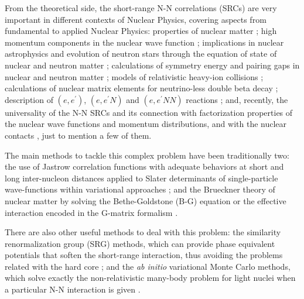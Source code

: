 \documentclass[aps,twocolumn,showpacs,preprintnumbers,amsmath,amssymb,nofootinbib,superscriptaddress,showkeys,noeprint]{revtex4-1}
\begin{document}
 From the theoretical side, the short-range N-N correlations (SRCs)
 are very important in different contexts of Nuclear Physics, covering
 aspects from fundamental to applied Nuclear Physics: properties of
 nuclear matter \cite{Bethe:1971xm, Jeukenne:1976uy, Ramos:1989hqs,
   Dewulf:2003nj, Vonderfecht:1991zz}; high momentum components in the
 nuclear wave function \cite{Fantoni:1984zz, Muther:1995zz,
   Wiringa:2013ala, Benhar:1986jha, VanOrden:1979mt, Sargsian:2012sm};
 implications in nuclear astrophysics and evolution of neutron stars
 through the equation of state of nuclear and neutron matter
 \cite{Riffert:1996jf, Frankfurt:2008zv, Mukherjee:2008un,
   Shen:2011kr, Ropke:2014fia, Hen:2016ysx}; calculations of symmetry
 energy and pairing gaps in nuclear and neutron matter
 \cite{Hen:2014yfa, Cai:2015xga, Ding:2016oxp, Rios:2017muz}; models
 of relativistic heavy-ion collisions \cite{Broniowski:2010jd};
 calculations of nuclear matrix elements for neutrino-less double beta
 decay \cite{Simkovic:2009pp, Kortelainen:2007mn}; description of
 $(e,e^\prime)$, $(e,e^\prime N)$ and $(e,e^\prime NN)$ reactions
 \cite{Frankfurt:1993sp, Weinstein:2010rt, Giusti:1999sv,
   Ryckebusch:1995usx, Colle:2015ena}; and, recently, the universality
 of the N-N SRCs and its connection with factorization properties of
 the nuclear wave functions and momentum distributions, and with the
 nuclear contacts \cite{Tan:2008a, Tan:2008b,Tan:2008c,
   Alvioli:2011aa, Alvioli:2013qyz, Weiss:2015mba, Alvioli:2016wwp,
   Weiss:2016obx, Weiss:2017huz}, just to mention a few of them.
 
 The main methods to tackle this complex problem have been
 traditionally two: the use of Jastrow correlation functions with
 adequate behaviors at short and long inter-nucleon distances applied
 to Slater determinants of single-particle wave-functions within
 variational approaches \cite{Jastrow:1955zz, Fantoni:1974jv,
   Fantoni:1975a, Guardiola:1980ma, Guardiola:1981ujn, Benhar:1991iw,
   Stoitsov:1993zz, Benhar:1994hw, Ryckebusch:1995usx,
   Guardiola:1996dq, Bishop:1998za, Vanhalst:2012ur}; and the
 Brueckner theory of nuclear matter \cite{Brueckner:1958zz,
   Brueckner:1954zz, Brueckner:1955zze} by solving the Bethe-Goldstone
 (B-G) equation \cite{Bethe:1956zz, Goldstone:1957zz, Dahll:1969hmo}
 or the effective interaction encoded in the G-matrix formalism
 \cite{Kohler:1961a, Haftel:1970zz, Jeukenne:1974zz, Nakayama:1984xgi,
   Hosaka:1985xwy, Nakayama:1987czg, Boersma:1993yy}.

There are also other useful methods to deal with this problem: the
similarity renormalization group (SRG) methods, which can provide
phase equivalent potentials that soften the short-range interaction,
thus avoiding the problems related with the hard core
\cite{Bogner:2006pc, Timoteo:2011tt, Neff:2015xda}; and the \textit{ab
  initio} variational Monte Carlo methods, which solve exactly the
non-relativistic many-body problem for light nuclei when a particular
N-N interaction is given \cite{Carlson:1993zz, Forest:1995zz,
  Quaglioni:2009mn, Hagen:2010gd, Leidemann:2012hr, Barrett:2013nh}.
\end{document}
